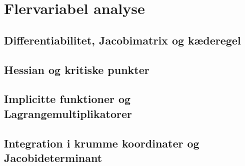\chapter{Flervariabel analyse}
\label{ch:flervariabel}
\section{Differentiabilitet, Jacobimatrix og kæderegel}
\leavevmode\par

\section{Hessian og kritiske punkter}
\leavevmode\par

\section{Implicitte funktioner og Lagrangemultiplikatorer}
\leavevmode\par

\section{Integration i krumme koordinater og Jacobideterminant}
\leavevmode\par
